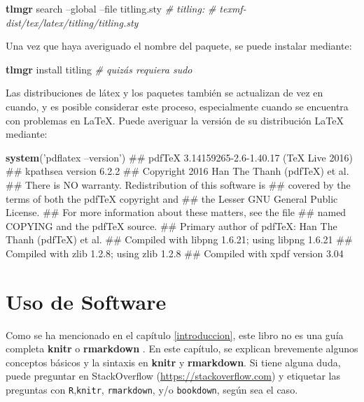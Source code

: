 \documentclass[12pt,]{krantz}
\makeatletter
\newenvironment{Shaded}{\begin{snugshade}}{\end{snugshade}}
\newcommand{\KeywordTok}[1]{\textcolor[rgb]{0.13,0.29,0.53}{\textbf{{#1}}}}
\newcommand{\StringTok}[1]{\textcolor[rgb]{0.31,0.60,0.02}{{#1}}}
\newcommand{\CommentTok}[1]{\textcolor[rgb]{0.56,0.35,0.01}{\textit{{#1}}}}
\newcommand{\NormalTok}[1]{{#1}}
\newenvironment{kframe}{%
\medskip{}
\setlength{\fboxsep}{.8em}
 \def\at@end@of@kframe{}%
 \ifinner\ifhmode%
  \def\at@end@of@kframe{\end{minipage}}%
  \begin{minipage}{\columnwidth}%
 \fi\fi%
 \def\FrameCommand##1{\hskip\@totalleftmargin \hskip-\fboxsep
 \colorbox{shadecolor}{##1}\hskip-\fboxsep
     \hskip-\linewidth \hskip-\@totalleftmargin \hskip\columnwidth}%
 \MakeFramed {\advance\hsize-\width
   \@totalleftmargin\z@ \linewidth\hsize
   \@setminipage}}%
 {\par\unskip\endMakeFramed%
 \at@end@of@kframe}
\renewenvironment{Shaded}{\begin{kframe}}{\end{kframe}}
\theoremstyle{definition}
\theoremstyle{definition}
\theoremstyle{remark}
\makeatother
\begin{document}
\begin{Shaded}
\begin{Highlighting}[]
\KeywordTok{tlmgr} \NormalTok{search --global --file titling.sty}
\CommentTok{# titling:}
\CommentTok{#    texmf-dist/tex/latex/titling/titling.sty}
\end{Highlighting}
\end{Shaded}

Una vez que haya averiguado el nombre del paquete, se puede instalar
mediante:

\begin{Shaded}
\begin{Highlighting}[]
\KeywordTok{tlmgr} \NormalTok{install titling  }\CommentTok{# quizás requiera sudo}
\end{Highlighting}
\end{Shaded}

Las distribuciones de látex y los paquetes también se actualizan de vez
en cuando, y es posible considerar este proceso, especialmente cuando se
encuentra con problemas en LaTeX. Puede averiguar la versión de su
distribución LaTeX mediante:

\begin{Shaded}
\begin{Highlighting}[]
\KeywordTok{system}\NormalTok{(}\StringTok{'pdflatex --version'}\NormalTok{)}
\NormalTok{## pdfTeX 3.14159265-2.6-1.40.17 (TeX Live 2016)}
\NormalTok{## kpathsea version 6.2.2}
\NormalTok{## Copyright 2016 Han The Thanh (pdfTeX) et al.}
\NormalTok{## There is NO warranty.  Redistribution of this software is}
\NormalTok{## covered by the terms of both the pdfTeX copyright and}
\NormalTok{## the Lesser GNU General Public License.}
\NormalTok{## For more information about these matters, see the file}
\NormalTok{## named COPYING and the pdfTeX source.}
\NormalTok{## Primary author of pdfTeX: Han The Thanh (pdfTeX) et al.}
\NormalTok{## Compiled with libpng 1.6.21; using libpng 1.6.21}
\NormalTok{## Compiled with zlib 1.2.8; using zlib 1.2.8}
\NormalTok{## Compiled with xpdf version 3.04}
\end{Highlighting}
\end{Shaded}

\chapter{Uso de Software}\label{uso-de-software}

Como se ha mencionado en el capítulo \ref{introduccion}, este libro no
es una guía completa \textbf{knitr} o \textbf{rmarkdown }. En este
capítulo, se explican brevemente algunos conceptos básicos y la sintaxis
en \textbf{knitr} y \textbf{rmarkdown}. Si tiene alguna duda, puede
preguntar en StackOverflow (\url{https://stackoverflow.com}) y etiquetar
las preguntas con \texttt{R},\texttt{knitr}, \texttt{rmarkdown}, y/o
\texttt{bookdown}, según sea el caso.
\end{document}
